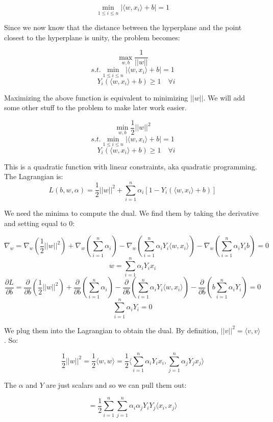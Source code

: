 \documentclass{minimal}
\begin{document}
$$
\min_{1 \leq i \leq n} |\langle w, x_i \rangle + b| = 1
$$

Since we now know that the distance between the hyperplane and the point closest
to the hyperplane is unity, the problem becomes: 

$$
\max_{w, b}\frac{1}{||w||}
$$
$$
s.t. \min_{1 \leq i \leq n} |\langle w, x_i \rangle + b| = 1
$$
$$
\quad Y_i(\langle w, x_i \rangle + b) \geq 1 \quad \forall i
$$

Maximizing the above function is equivalent to minimizing $||w||$. We will add
some other stuff to the problem to make later work easier.

$$
\min_{w, b}\frac{1}{2}||w||^2
$$
$$
s.t. \min_{1 \leq i \leq n} |\langle w, x_i \rangle + b| = 1
$$
$$
\quad Y_i(\langle w, x_i \rangle + b) \geq 1 \quad \forall i
$$


This is a quadratic function with linear constraints, aka quadratic programming.
The Lagrangian is:
$$
L(b, w, \alpha) = \frac{1}{2}||w||^2 + \sum_{i=1}^n \alpha_i [1 - Y_i(\langle
w, x_i \rangle + b)]
$$

We need the minima to compute the dual. We find them by taking the derivative
and setting equal to 0:

$$
\nabla_w = 
\nabla_w \left( \frac{1}{2}||w||^2 \right) + 
\nabla_w \left(\sum_{i=1}^n \alpha_i \right) - 
\nabla_w \left( \sum_{i=1}^n \alpha_i Y_i \langle w, x_i \rangle \right) - 
\nabla_w \left( \sum_{i=1}^n \alpha_i Y_i b \right)
= 0
$$
$$
w = \sum_{i=1}^n \alpha_i Y_i x_i
$$
$$
\frac{\partial L}{\partial b} = \frac{\partial}{\partial b}
\left( \frac{1}{2}||w||^2 \right) + \frac{\partial}{\partial b}
\left(\sum_{i=1}^n \alpha_i \right) - \frac{\partial}{\partial b}\left( \sum_{i=1}^n \alpha_i Y_i \langle
w, x_i \rangle \right) - \frac{\partial}{\partial b} \left( b \sum_{i=1}^n
\alpha_i Y_i \right)
=0
$$
$$
\sum_{i=1}^n \alpha_i Y_i = 0
$$

We plug them into the Lagrangian to obtain the dual. By
definition, $||v||^2 = \langle v, v \rangle$. So:

$$
\frac{1}{2} ||w||^2 = \frac{1}{2} \langle w, w \rangle = 
\frac{1}{2} \langle \sum_{i=1}^n \alpha_i Y_i x_i, \sum_{j=1}^n \alpha_j Y_j x_j \rangle
$$

The $\alpha$ and $Y$ are just scalars and so we can pull them out:

$$
= \frac{1}{2} \sum_{i=1}^n \sum_{j=1}^n \alpha_i \alpha_j Y_i Y_j \langle x_i, x_j \rangle
$$
\end{document}
